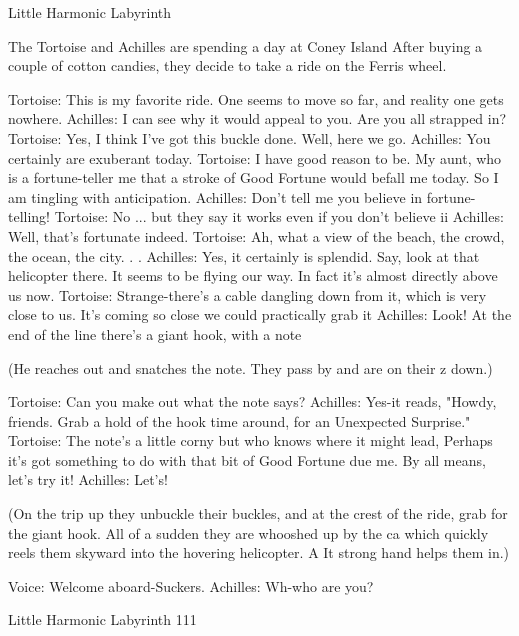 
                     Little Harmonic Labyrinth

  The Tortoise and Achilles are spending a day at Coney Island After buying a
  couple of cotton candies, they decide to take a ride on the Ferris wheel.

Tortoise: This is my favorite ride. One seems to move so far, and
reality one gets nowhere.
Achilles: I can see why it would appeal to you. Are you all strapped in?
Tortoise: Yes, I think I've got this buckle done. Well, here we go.
Achilles: You certainly are exuberant today.
Tortoise: I have good reason to be. My aunt, who is a fortune-teller me that a stroke of
        Good Fortune would befall me today. So I am tingling with anticipation.
Achilles: Don't tell me you believe in fortune-telling!
Tortoise: No ... but they say it works even if you don't believe ii
Achilles: Well, that's fortunate indeed.
Tortoise: Ah, what a view of the beach, the crowd, the ocean, the city. . .
Achilles: Yes, it certainly is splendid. Say, look at that helicopter there. It seems to be
        flying our way. In fact it's almost directly above us now.
Tortoise: Strange-there's a cable dangling down from it, which is very close to us. It's
        coming so close we could practically grab it
Achilles: Look! At the end of the line there's a giant hook, with a note

(He reaches out and snatches the note. They pass by and are on their z down.)

Tortoise: Can you make out what the note says?
Achilles: Yes-it reads, "Howdy, friends. Grab a hold of the hook time around, for an
       Unexpected Surprise."
Tortoise: The note's a little corny but who knows where it might lead, Perhaps it's got
       something to do with that bit of Good Fortune due me. By all means, let's try it!
Achilles: Let's!

  (On the trip up they unbuckle their buckles, and at the crest of the ride, grab for the
  giant hook. All of a sudden they are whooshed up by the ca which quickly reels
  them skyward into the hovering helicopter. A It strong hand helps them in.)

Voice: Welcome aboard-Suckers.
Achilles: Wh-who are you?




Little Harmonic Labyrinth                                                               111

